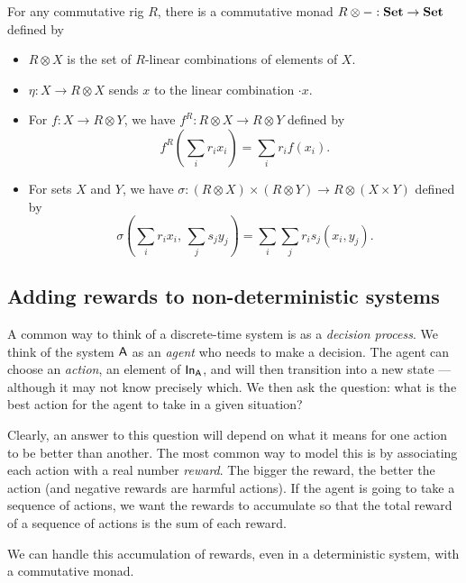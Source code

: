 \documentclass[DynamicalBook]{subfiles}
\begin{document}
\begin{proposition}
  For any commutative rig $R$, there is a commutative monad $R \otimes - :
  \textbf{Set} \to \textbf{Set}$ defined by
  \begin{itemize}
    \item $R \otimes X$ is the set of $R$-linear combinations of elements of
      $X$.
    \item $\eta : X \to R \otimes X$ sends $x$ to the linear combination $
      \cdot x$.
    \item For $f : X \to R \otimes Y$, we have $f^{R} : R \otimes X \to R
      \otimes Y$ defined by
      \[
f^R\left( \sum_{i}r_i x_i \right) = \sum_{i} r_i f(x_i).
\]
    \item For sets $X$ and $Y$, we have $\sigma : (R \otimes X) \times (R
      \otimes Y) \to R \otimes (X \times Y)$ defined by
      \[
\sigma\left( \sum_i r_i x_i,\, \sum_j s_j y_j \right) = \sum_{i}\sum_{j} r_i s_j
(x_i, y_j).
      \]
  \end{itemize}
\end{proposition}


\subsection{Adding rewards to non-deterministic systems}

A common way to think of a discrete-time system is as a \emph{decision process}. We
think of the system $\mathsf{A}$ as an \emph{agent} who needs to make a decision.
The agent can choose an \emph{action}, an element of $\mathsf{In}_{\mathsf{A}}$, and will then
transition into a new state --- although it may not know precisely which. We
then ask the question: what is the best action for the agent to take in a given
situation?

Clearly, an answer to this question will depend on what it means for one action
to be better than another. The most common way to model this is by associating
each action with a real number \emph{reward}. The bigger the reward, the better
the action (and negative rewards are harmful actions). If the agent is going to
take a sequence of actions, we want the rewards to accumulate so that the total
reward of a sequence of actions is the sum of each reward.

We can handle this accumulation of rewards, even in a deterministic system, with
a commutative monad.
\end{document}
